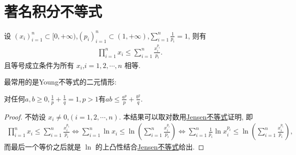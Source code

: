 \documentclass[../../main.tex]{subfiles}%
\begin{document}
\section{著名积分不等式}

\begin{theorem}[Young不等式初等形式]\label{theorem:Young不等式初等形式}
设 $(x_i)_{i = 1}^n \subset [0, +\infty)$,$(p_i)_{i = 1}^n \subset (1, +\infty)$,$\sum_{i = 1}^n \frac{1}{p_i} = 1$, 则有
\begin{align*}
\prod_{i = 1}^n x_i \leqslant \sum_{i = 1}^n \frac{x_i^{p_i}}{p_i}.
\end{align*}
且等号成立条件为所有 $x_i$,$i = 1,2,\cdots,n$ 相等.
\end{theorem}
\begin{note}
最常用的是Young不等式的二元情形:

对任何$a,b\geqslant 0,\frac{1}{p}+\frac{1}{q}=1,p>1$有$ab\leqslant \frac{a^p}{p}+\frac{b^q}{q}.$
\end{note}
\begin{proof}
不妨设 $x_i \neq 0$,$(i = 1,2,\cdots,n)$. 本结果可以取对数用\hyperref[theorem:Jensen不等式1111]{Jensen不等式}证明, 即
\begin{align*}
\prod_{i = 1}^n x_i \leqslant \sum_{i = 1}^n \frac{x_i^{p_i}}{p_i}\Leftrightarrow \sum_{i = 1}^n \ln x_i \leqslant \ln \left(\sum_{i = 1}^n \frac{x_i^{p_i}}{p_i}\right) \Leftrightarrow \sum_{i = 1}^n \frac{1}{p_i} \ln x_i^{p_i} \leqslant \ln \left(\sum_{i = 1}^n \frac{x_i^{p_i}}{p_i}\right),
\end{align*}
而最后一个等价之后就是 $\ln$ 的上凸性结合\hyperref[theorem:Jensen不等式1111]{Jensen不等式}给出.
\end{proof}
\end{document}
